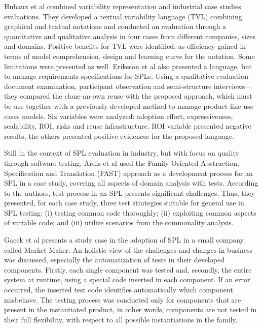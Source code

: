 Hubaux et al \cite{hubaux10} combined variability representation and industrial case studies evaluations. They developed a textual variability language (TVL) combining graphical and textual notations and conducted an evaluation through a quantitative and qualitative analysis in four cases from different companies, sizes and domains. Positive benefits for TVL were identified, as efficiency gained in terms of model comprehension, design and learning curve for the notation. Some limitations were presented as well. Eriksson et al \cite{eriksson09} also presented a language, but to manage requirements specifications for SPLs. Using a qualitative evaluation -- document examination, participant observation and semi-structure interviews -- they compared the clone-an-own reuse with the proposed approach, which must be use together with a previously developed method to manage product line use cases models. Six variables were analyzed: adoption effort, expressiveness, scalability, ROI, risks and reuse infrastructure. ROI variable presented negative results, the others presented positive evidences for the proposed language. 


Still in the context of SPL evaluation in industry, but with focus on quality through software testing, Ardis et al \cite{ardis00} used the Family-Oriented Abstraction, Specification and Translation (FAST) approach as a development process for an SPL in a case study, covering all aspects of domain analysis with tests. According to the authors, test process in an SPL presents significant challenges. Thus, they presented, for each case study, three test strategies suitable for general use in SPL testing: (i) testing common code thoroughly; (ii) exploiting common aspects of variable code; and (iii) utilize scenarios from the commonality analysis. 

Gacek et al \cite{gacek01} presents a study case in the adoption of SPL in a small company called Market Maker. An holistic view of the challenges and changes in business was discussed, especially the automatization of tests in their developed components. Firstly, each single component was tested and, secondly, the entire system at runtime, using a special code inserted in each component. If an error occurred, the inserted test code identifies automatically which component misbehave. The testing process was conducted only for components that are present in the instantiated product, in other words, components are not tested in their full flexibility, with respect to all possible instantiations in the family.

